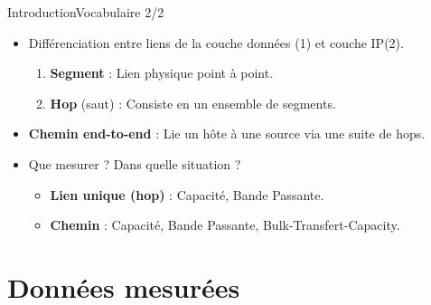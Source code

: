 \documentclass[compress]{beamer}
\begin{document}
\begin{frame}{Introduction}{Vocabulaire 2/2}
\begin{itemize}
	\item Différenciation entre liens de la couche données (1) et couche IP(2).
	\begin{enumerate}
		\item \textbf{Segment} : Lien physique point à point. %
		\item \textbf{Hop} (saut) : Consiste en un ensemble de segments. %
	\end{enumerate}
	\vspace{10pt}
	\item \textbf{Chemin end-to-end} : Lie un hôte à une source via une suite de hops.
	\vspace{10pt}
	\item Que mesurer ? Dans quelle situation ? 
	\begin{itemize}
		\item \textbf{Lien unique (hop)} : Capacité, Bande Passante.
		\item \textbf{Chemin} : Capacité, Bande Passante, Bulk-Transfert-Capacity.
	\end{itemize}
\end{itemize}
\end{frame}



\section{Données mesurées}
\end{document}
